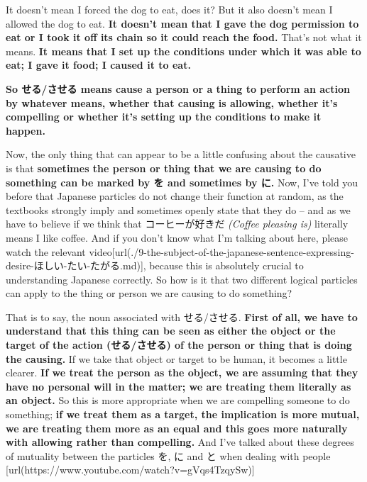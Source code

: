 {}

It doesn't mean I forced the dog to eat, does it? But it also doesn't mean I allowed the dog to eat. {\bf It doesn't mean that I gave the dog permission to eat or I took it off its chain so it could reach the food.} That's not what it means. {\bf It means that I set up the conditions under which it was able to eat; I gave it food; I caused it to eat.}

\thinrule

{\bf So せる/させる means cause a person or a thing to perform an action by whatever means, whether that causing is allowing, whether it's compelling or whether it's setting up the conditions to make it happen.}

Now, the only thing that can appear to be a little confusing about the causative is that {\bf sometimes the person or thing that we are causing to do something can be marked by を and sometimes by に.} Now, I've told you before that Japanese particles do not change their function at random, as the textbooks strongly imply and sometimes openly state that they do -- and as we have to believe if we think that コーヒーが好きだ {\em (Coffee pleasing is)} literally means I like coffee. And if you don't know what I'm talking about here, please watch the relevant video\goto{{[}9{]}}[url(./9-the-subject-of-the-japanese-sentence-expressing-desire-ほしい-たい-たがる.md)], because this is absolutely crucial to understanding Japanese correctly. So how is it that two different logical particles can apply to the thing or person we are causing to do something?

{}

That is to say, the noun associated with せる/させる. {\bf First of all, we have to understand that this thing can be seen as either the object or the target of the action (せる/させる) of the person or thing that is doing the causing.} If we take that object or target to be human, it becomes a little clearer. {\bf If we treat the person as the object, we are assuming that they have no personal will in the matter; we are treating them literally as an object.} So this is more appropriate when we are compelling someone to do something; {\bf if we treat them as a target, the implication is more mutual, we are treating them more as an equal and this goes more naturally with allowing rather than compelling.} And I've talked about these degrees of mutuality between the particles を, に and と when dealing with people [url(https://www.youtube.com/watch?v=gVqs4TzqySw)]

